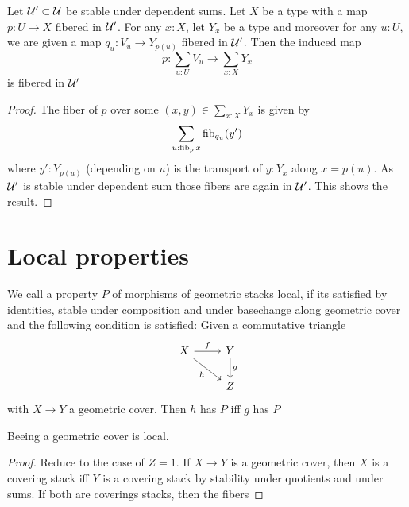 \documentclass{article}
\begin{document}
\begin{lemma}{\label{lemma:AtlasSum}}
	Let $\mathcal{U}' \subset \mathcal{U}$ be stable under dependent sums.
	Let $X$ be a type with a  map $p : U \to X$ fibered in $\mathcal{U}'$.  For any $x : X$, let $Y_x$ be a type and moreover for any $u : U$, we are given a map $q_u : V_u \to Y_{p(u)}$ fibered in $\mathcal{U}'$. Then the induced map
	\[
	p : \sum_{u : U} V_u \to \sum_{x : X} Y_{x}
	\]
	is fibered in $\mathcal{U}'$
\end{lemma}
\begin{proof}
	The fiber of $p$ over some $(x,y) \in \sum_{x :X} Y_x$ is given by
	\[
	\sum_{u : \operatorname{fib}_p x} \operatorname{fib}_{q_u} (y') 
	\]
	where $y' : Y_{p(u)}$ (depending on $u$) is the transport of $y : Y_x$ along $x = p(u)$. As $\mathcal{U}'$ is stable under dependent sum %
	those fibers are again in $\mathcal{U}'$. This shows the result.
\end{proof}













\section{Local properties}

\begin{definition}
	We call a property $P$ of morphisms of geometric stacks local, if its satisfied by identities, stable under composition and under basechange along geometric cover  and the following condition is satisfied:
	Given a commutative triangle%
	\[\begin{tikzcd}
		X & Y \\
		& Z
		\arrow["f", from=1-1, to=1-2]
		\arrow["h"', from=1-1, to=2-2]
		\arrow["g", from=1-2, to=2-2]
	\end{tikzcd}\]
with $X \to Y$ a geometric cover. Then $h$ has $P$ iff $g$ has $P$
\end{definition}
\begin{lemma}
	Beeing a geometric cover is local.
\end{lemma}
\begin{proof}
	Reduce to the case of $Z = 1$. If $X \to Y$ is a geometric cover, then $X$ is a covering stack iff $Y$ is a covering stack by stability under quotients and under sums. If both are coverings stacks, then the fibers 
\end{proof}
\end{document}
